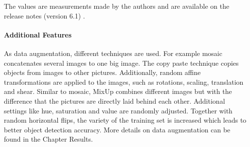 The values are measurements made by the authors and are available on the release notes (version 6.1) \cite{release_current}.

\paragraph{Additional Features}
As data augmentation, different techniques are used. For example mosaic concatenates several images to one big image. The copy paste technique copies objects from images to other pictures.  Additionally, random affine transformations are applied to the images, such as rotations, scaling, translation and shear. Similar to mosaic, MixUp combines different images but with the difference that the pictures are directly laid behind each other. Additional settings like hue, saturation and value are randomly adjusted. Together with random horizontal flips, the variety of the training set is increased which leads to better object detection accuracy. More details on data augmentation can be found in the Chapter Results.

